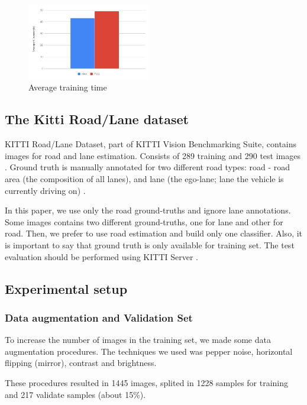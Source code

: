 \begin{figure}[ht]
  \centering
  \includegraphics[width=0.48\textwidth]{figures/train_time.png}
  \caption{Average training time}
  \label{fig:train_time}
\end{figure}

\subsection{The Kitti Road/Lane dataset}

KITTI Road/Lane Dataset, part of KITTI Vision Benchmarking Suite, contains  images for road and lane estimation. Consists of 289 training and 290 test images . Ground truth is manually annotated for two different road types: road - road area (the composition of all lanes), and lane (the ego-lane; lane the vehicle is currently driving on) \cite{KITTI}. 

In this paper, we use only the road ground-truths and ignore lane annotations. Some images contains two different ground-truths, one for lane and other for road. Then, we prefer to use road estimation and build only one classifier. Also, it is important to say that ground truth is only available for training set. The test evaluation should be performed using KITTI Server \cite{KITTI}. 

\subsection{Experimental setup}

\subsubsection{Data augmentation and Validation Set}

To increase the number of images in the training set, we made some data augmentation procedures. The techniques we used was pepper noise, horizontal flipping (mirror), contrast and brightness.

These procedures resulted in 1445 images, splited in 1228 samples for training and 217 validate samples (about 15\%).

